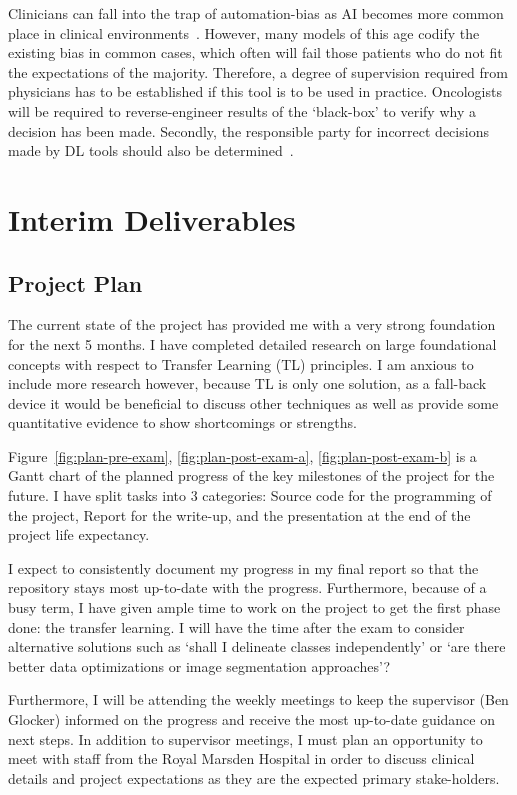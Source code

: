 \documentclass[11pt,twoside]{report}
\begin{document}
Clinicians can fall into the trap of automation-bias as AI becomes more common place in clinical environments~\cite{automation-bias}. However, many models of this age codify the existing bias in common cases, which often will fail those patients who do not fit the expectations of the majority. Therefore, a degree of supervision required from physicians has to be established if this tool is to be used in practice. Oncologists will be required to reverse-engineer results of the `black-box' to verify why a decision has been made. Secondly, the responsible party for incorrect decisions made by DL tools should also be determined~\cite{AI-in-cancer-diagnosis-era}.

\chapter{Interim Deliverables}

\section{Project Plan}

The current state of the project has provided me with a very strong foundation for the next 5 months. I have completed detailed research on large foundational concepts with respect to Transfer Learning (TL) principles. I am anxious to include more research however, because TL is only one solution, as a fall-back device it would be beneficial to discuss other techniques as well as provide some quantitative evidence to show shortcomings or strengths.

Figure~\ref{fig:plan-pre-exam}, \ref{fig:plan-post-exam-a}, \ref{fig:plan-post-exam-b} is a Gantt chart of the planned progress of the key milestones of the project for the future. I have split tasks into 3 categories: Source code for the programming of the project, Report for the write-up, and the presentation at the end of the project life expectancy. 

I expect to consistently document my progress in my final report so that the repository stays most up-to-date with the progress. Furthermore, because of a busy term, I have given ample time to work on the project to get the first phase done: the transfer learning. I will have the time after the exam to consider alternative solutions such as `shall I delineate classes independently' or `are there better data optimizations or image segmentation approaches'?

Furthermore, I will be attending the weekly meetings to keep the supervisor (Ben Glocker) informed on the progress and receive the most up-to-date guidance on next steps. In addition to supervisor meetings, I must plan an opportunity to meet with staff from the Royal Marsden Hospital in order to discuss clinical details and project expectations as they are the expected primary stake-holders.
\end{document}
